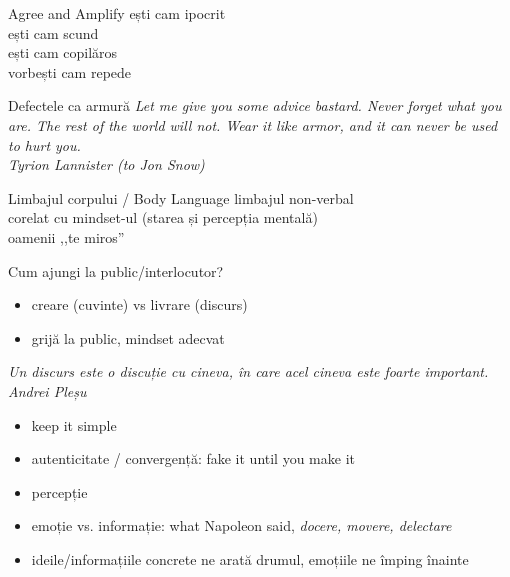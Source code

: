 \documentclass{simple}
\begin{document}
\begin{frame}{Agree and Amplify}
  \centering
  \pause
  ești cam ipocrit\\
  \vspace{3mm}
  \pause
  ești cam scund\\
  \vspace{3mm}
  \pause
  ești cam copilăros\\
  \vspace{3mm}
  \pause
  vorbești cam repede\\
\end{frame}

\begin{frame}{Defectele ca armură}
  \centering
  \textit{Let me give you some advice bastard. Never forget what you are. The rest of the world will not. Wear it like armor, and it can never be used to hurt you.}\\
  \vspace{3mm}
  \hfill \textit{Tyrion Lannister (to Jon Snow)}
\end{frame}

\begin{frame}{Limbajul corpului / Body Language}
  \centering
  \pause
  limbajul non-verbal\\
  \vspace{3mm}
  \pause
  corelat cu mindset-ul (starea și percepția mentală)\\
  \vspace{3mm}
  \pause
  oamenii ,,te miros''
\end{frame}

\begin{frame}{Cum ajungi la public/interlocutor?}
  \begin{itemize}
    \pause
    \item creare (cuvinte) vs livrare (discurs)
    \pause
    \item grijă la public, mindset adecvat
  \end{itemize}
  \centering
  \pause
  \vspace{3mm}
  \textit{Un discurs este o discuție cu cineva, în care acel cineva este foarte important.}\\
  \vspace{3mm}
  \hfill \textit{Andrei Pleșu}\\
  \vspace{3mm}
  \begin{itemize}
    \pause
    \item keep it simple
    \pause
    \item autenticitate / convergență: fake it until you make it
    \pause
    \item percepție
    \pause
    \item emoție vs. informație: what Napoleon said, \textit{docere, movere, delectare}
    \pause
    \item ideile/informațiile concrete ne arată drumul, emoțiile ne împing înainte
  \end{itemize}
\end{frame}
\end{document}
